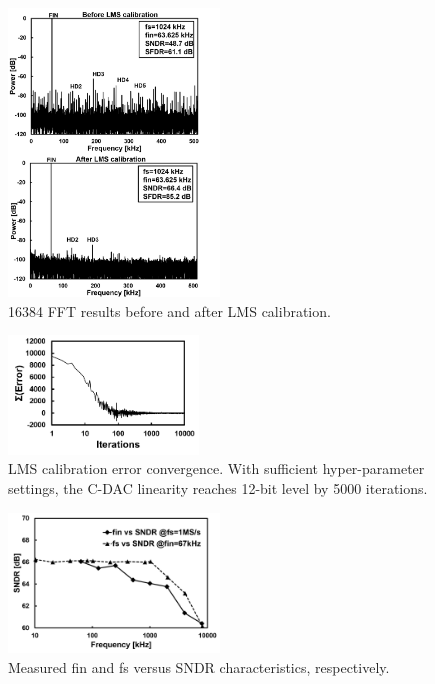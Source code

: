 \documentclass[journal]{IEEEtran}
\begin{document}
\begin{figure}[!t]
\centering
 \includegraphics[width=0.5\textwidth]{figs/fft.png}
  \caption{16384 FFT results before and after LMS calibration.}
  \label{aftercal}
\end{figure}

\begin{figure}[!t]
\centering
 \includegraphics[width=0.45\textwidth]{figs/lms.png}
  \caption{LMS calibration error convergence. With sufficient hyper-parameter settings, the C-DAC linearity reaches 12-bit level by 5000 iterations. }
  \label{lms}
\end{figure}

\begin{figure}[!t]
\centering
 \includegraphics[width=0.5\textwidth]{figs/freq-sndr.png}
  \caption{Measured fin and fs versus SNDR characteristics, respectively.}
  \label{freqvssndr}
\end{figure}
\end{document}
